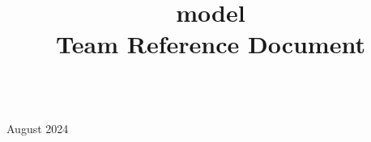 \documentclass[10pt]{article} %
\title{\vspace{-4ex}\Large{model \\ Team Reference Document}}
\author{}
\date{}
\begin{document}
\begin{landscape}
\begin{multicols}{2}

\maketitle
\vspace{-10ex}

\hspace*{-\parindent}%
\begin{minipage}{0.45\linewidth}
\begin{center}
  \\
August 2024
\end{center}
\end{minipage}

\tableofcontents
\pagestyle{fancy}



\end{multicols}



\end{landscape}
\end{document}
